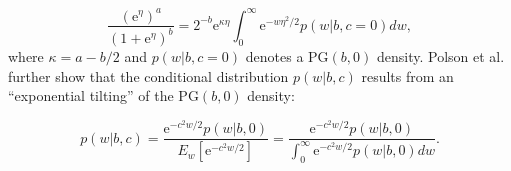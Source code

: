 \documentclass[useAMS,referee]{biom}
\begin{document}
\begin{equation}
\frac{(\text{e}^{\eta})^a}{(1 + \text{e}^{\eta})^b} = 2^{-b}\text{e}^{\kappa \eta} \int_{0}^{\infty} \text{e}^{-{w}\eta^2/2}p({w}|b,c = 0)d{w}, \label{eq:pg2}
\end{equation}
where $\kappa = a - b/2$ and $p(w|b,c = 0)$ denotes a $\text{PG}(b,0)$ density. Polson {et al.} further show that the conditional distribution $p(w|b,c)$ results from an ``exponential tilting'' of the $\text{PG}(b,0)$ density:

\begin{equation}
	p({w}|b,c) = \frac{\text{e}^{-c^2{w}/2}p({w}|b,0)}{E_{{w}}[\text{e}^{-c^2{w}/2}]} = \frac{\text{e}^{-c^2{w}/2}p({w}|b,0)}{\int_0^\infty \text{e}^{-c^2{w}/2}p({w}|b,0)d{w}}. \label{eq:pg3}
\end{equation}
\end{document}
